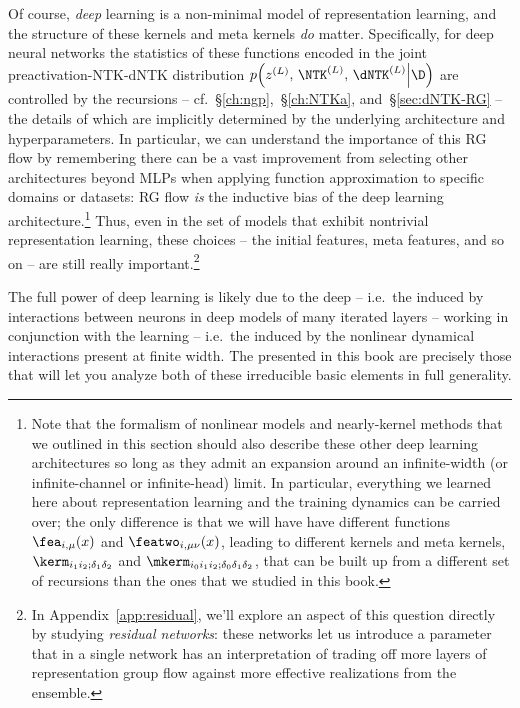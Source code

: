 Of course, \emph{deep} learning is a non-minimal model of representation learning, and the structure of these kernels and meta kernels \emph{do} matter.
Specifically, for deep neural networks the statistics of these functions encoded in the joint preactivation-NTK-dNTK distribution 
$p\Big(z^{(L)}, \, \NTK^{(L)},\, \dNTK^{(L)}\Big\vert \D\Big)$
are controlled by the  recursions -- cf.~\S\ref{ch:ngp},~\S\ref{ch:NTKa}, and~\S\ref{sec:dNTK-RG}  -- the details of which are implicitly determined by the underlying architecture and hyperparameters.
In particular, we can understand the importance 
of this RG flow
by remembering there can be a vast improvement from selecting other architectures 
beyond
MLPs when applying function approximation to specific domains or datasets: RG flow \emph{is} the inductive bias of the deep learning architecture.\footnote{Note that the formalism of nonlinear models and nearly-kernel methods that we outlined in this section should also describe these other deep learning architectures so long as they admit an expansion around an infinite-width (or infinite-channel or infinite-head) limit. In particular, everything we learned here about representation learning and the training dynamics can be carried over; the only difference is that we will have have different functions $\fea_{i,\mu}(x)$ and $\featwo_{i,\mu\nu}(x)$, leading to different kernels and meta kernels, $\kerm_{i_1i_2;\delta_1\delta_2}$ and $\mkerm_{i_0i_1i_2;\delta_0\delta_1\delta_2}$, that can be built up from a different set of recursions than the ones that we studied in this book.} Thus, even in the set of models that exhibit nontrivial representation learning, these choices -- the initial features, meta features, and so on -- are still really important.\footnote{
In Appendix~\ref{app:residual}, we'll explore an aspect of this question directly by studying \emph{residual networks}: these networks let us introduce a parameter that in a single network has an interpretation of trading off more layers of representation group flow against more effective realizations from the ensemble.}

The full power of deep learning is likely due to the deep -- i.e.~the  induced by interactions between neurons in deep models of many iterated layers -- working in conjunction with the  learning -- i.e.~the  induced by the nonlinear dynamical interactions present at finite width. The  presented in this book are precisely those that will let you analyze both of these irreducible basic elements in full generality.




























